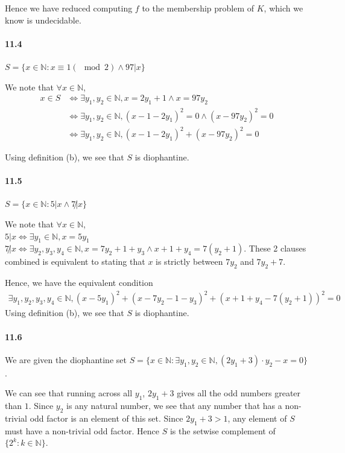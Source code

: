 \documentclass{article}
\begin{document}
Hence we have reduced computing $f$ to the membership problem of $K$, which we know is undecidable.


\paragraph{11.4} $S=\{x\in \mathbb{N} : x\equiv 1 (\mod 2)\land 97 | x\}$

We note that $\forall x\in \mathbb{N}$,
\begin{align*}
	x\in S&\iff \exists y_1,y_2\in \mathbb{N}, x=2y_1+1\land x=97y_2\\
	&\iff \exists y_1,y_2\in \mathbb{N}, (x-1-2y_1)^2=0\land (x-97y_2)^2=0\\
	&\iff \exists y_1,y_2\in \mathbb{N}, (x-1-2y_1)^2+(x-97y_2)^2=0
\end{align*}

Using definition (b), we see that $S$ is diophantine.

\paragraph{11.5} $S=\{x\in \mathbb{N}:5|x\land 7\not | x\}$

We note that $\forall x\in \mathbb{N}$,\\
$5|x\iff \exists y_1\in \mathbb{N}, x=5y_1$\\
$7\not | x\iff \exists y_2,y_3,y_4\in \mathbb{N}, x=7y_2 + 1 + y_3\land x + 1 + y_4 = 7(y_2+1)$. These 2 clauses combined is equivalent to stating that $x$ is strictly between $7y_2$ and $7y_2+7$.

Hence, we have the equivalent condition
\begin{align*}
	\exists y_1,y_2,y_3,y_4\in \mathbb{N}, (x-5y_1)^2 + (x-7y_2-1-y_3)^2 + (x+1+y_4-7(y_2+1))^2 = 0
\end{align*}
Using definition (b), we see that $S$ is diophantine.

\paragraph{11.6} We are given the diophantine set $S=\{x\in \mathbb{N} : \exists y_1,y_2\in \mathbb{N}, (2y_1+3)\cdot y_2 - x = 0\}$.

We can see that running across all $y_1$, $2y_1+3$ gives all the odd numbers greater than $1$. Since $y_2$ is any natural number, we see that any number that has a non-trivial odd factor is an element of this set. Since $2y_1+3>1$, any element of $S$ must have a non-trivial odd factor. Hence $S$ is the setwise complement of $\{2^k:k\in \mathbb{N}\}$.
\end{document}
